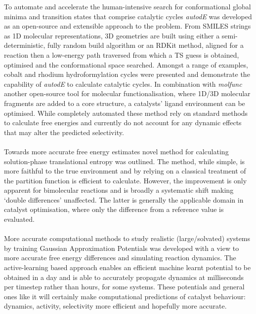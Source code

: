 \documentclass[../main.tex]{subfiles}
\begin{document}
To automate and accelerate the human-intensive search for conformational global minima and transition states that comprise catalytic cycles \emph{autodE} was developed as an open-source and extensible approach to the problem. From SMILES strings as 1D molecular representations, 3D geometries are built using either a semi-deterministic, fully random build algorithm or an RDKit\cite{Landrum2019} method, aligned for a reaction then a low-energy path traversed from which a TS guess is obtained, optimised and the conformational space searched. Amongst a range of examples, cobalt and rhodium hydroformylation cycles were presented and demonstrate the capability of \emph{autodE} to calculate catalytic cycles. In combination with \emph{molfunc} another open-source tool for molecular functionalisation, where 1D/3D molecular fragments are added to a core structure, a catalysts' ligand environment can be optimised. While completely automated these method rely on standard methods to calculate free energies and currently do not account for any dynamic effects that may alter the predicted selectivity. 
\\\\

Towards more accurate free energy estimates novel method for calculating solution-phase translational entropy was outlined. The method, while simple, is more faithful to the true environment and by relying on a classical treatment of the partition function is efficient to calculate. However, the improvement is only apparent for bimolecular reactions and is broadly a systematic shift making `double differences' unaffected. The latter is generally the applicable domain in catalyst optimisation, where only the difference from a reference value is evaluated.
\\\\
More accurate computational methods to study realistic (large/solvated) systems by training Gaussian Approximation Potentials was developed with a view to more accurate free energy differences and simulating reaction dynamics. The active-learning based approach enables an efficient machine learnt potential to be obtained in a day and is able to accurately propagate dynamics at milliseconds per timestep rather than hours, for some systems. These potentials and general ones like it will certainly make computational predictions of catalyst behaviour: dynamics, activity, selectivity more efficient and hopefully more accurate.
\end{document}
